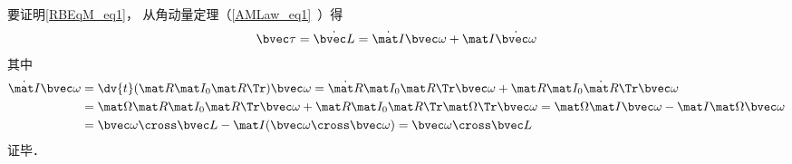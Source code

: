 要证明\autoref{RBEqM_eq1}， 从角动量定理（\autoref{AMLaw_eq1}~）得
\begin{equation}\label{RBEqM_eq3}
\bvec \tau = \dot{\bvec L} = \dot{\mat I} \bvec\omega + \mat I \dot{\bvec\omega}
\end{equation}
其中
\begin{equation}
\begin{aligned}
\dot{\mat I}\bvec\omega &= \dv{t}(\mat R \mat I_0 \mat R\Tr)\bvec\omega
= \dot{\mat R} \mat I_0 \mat R\Tr \bvec\omega + \mat R \mat I_0 \dot{\mat R}\Tr \bvec\omega\\
&= \mat \Omega \mat R \mat I_0 \mat R\Tr \bvec\omega + \mat R \mat I_0 \mat R\Tr \mat \Omega\Tr \bvec\omega
= \mat \Omega \mat I \bvec\omega - \mat I \mat \Omega \bvec\omega\\
&= \bvec \omega \cross \bvec L - \mat I (\bvec\omega\cross\bvec\omega)
= \bvec \omega \cross \bvec L
\end{aligned}
\end{equation}
证毕．

